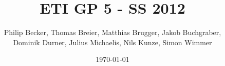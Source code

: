\title{ETI GP 5 - SS 2012}
\date{\today}
\author{Philip Becker, Thomas Breier, Matthias Brugger, Jakob Buchgraber,\\Dominik Durner, Julius Michaelis, Nils Kunze, Simon Wimmer}

